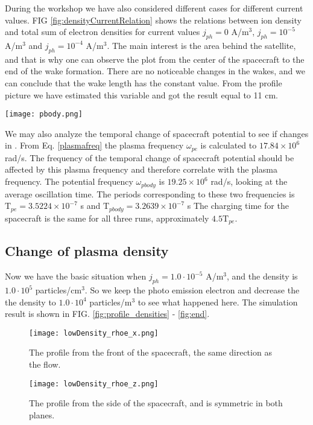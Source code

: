 \documentclass[aip, 
rsi, 
amsmath,
amssymb,
longbibliography,
preprint]{revtex4-1}
\begin{document}
During the workshop we have also considered different cases for different current values. FIG \ref{fig:densityCurrentRelation} shows the relations between ion density and total sum of electron densities for current values $j_{ph}=0$ A/m$^3$, $j_{ph}=10^{-5}$ A/m$^3$ and $j_{ph}=10^{-4}$ A/m$^3$. The main interest is the area behind the satellite, and that is why one can observe the plot from the center of the spacecraft to the end of the wake formation. There are no noticeable changes in the wakes, and we can conclude that the wake length has the constant value. From the profile picture we have estimated this variable and got the result equal to 11 cm.

\begin{figure*}
\texttt{[image: pbody.png]}
\caption{The change in the spacecraft potential over time. Data from one simulation with no photo emission, and two simulations with photo-emission from the wake side on the body. $j_{ph}$ is the photo-emission density in A/m$^3$. \label{fig:potential_time}}
\end{figure*}

We may also analyze the temporal change of spacecraft potential to see if changes in .  From Eq. \ref{plasmafreq} the plasma frequency $\omega_{pe}$ is calculated to $17.84 \times 10^6$ rad/s. The frequency of the temporal change of spacecraft potential should be affected by this plasma frequency and therefore correlate with the plasma frequency. The potential frequency $\omega_{pbody}$ is $19.25 \times 10^6$ rad/s, looking at the average oscillation time. The periods corresponding to these two frequencies is $\mathrm{T}_{pe} = 3.5224 \times 10^{-7}$ s and $\mathrm{T}_{pbody} = 3.2639 \times 10^{-7}$ s The charging time for the spacecraft is the same for all three runs, approximately $4.5\mathrm{T}_{pe}$.

\subsection{Change of plasma density}

Now we have the basic situation when $j_{ph}= 1.0\cdot10^{-5}$ A/m$^3$, and the density is $1.0\cdot10^5$ particles/cm$^3$. So we keep the photo emission electron and decrease the the density to $1.0\cdot10^4$ particles/m$^3$ to see what happened here. The simulation result is shown in FIG. \ref{fig:profile_densities} - \ref{fig:end}.

\begin{figure*}[!ht]
\begin{subfigure}{0.45\textwidth}
\texttt{[image: lowDensity\_rhoe\_x.png]}
\caption{The profile from the front of the spacecraft, the same direction as the flow.}
\end{subfigure}
\begin{subfigure}{0.45\textwidth}
\texttt{[image: lowDensity\_rhoe\_z.png]}
\caption{The profile from the side of the spacecraft, and is symmetric in both planes.}
\end{subfigure}
\caption{The situation when we have lowered the density by an order of 1 and the photo emission is $j_{ph} = 10^{-5}$ A/m$^3$} \label{fig:profile_densities}
\end{figure*}
\end{document}
